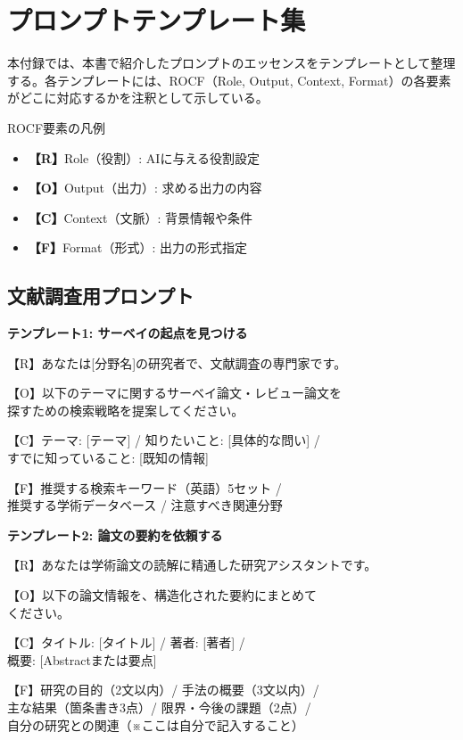 \chapter{プロンプトテンプレート集}
\label{app:prompts}

本付録では、本書で紹介したプロンプトのエッセンスをテンプレートとして整理する。各テンプレートには、ROCF（Role, Output, Context, Format）の各要素がどこに対応するかを注釈として示している。

\begin{itembox}[l]{ROCF要素の凡例}
\begin{itemize}
\item \textbf{【R】}Role（役割）: AIに与える役割設定
\item \textbf{【O】}Output（出力）: 求める出力の内容
\item \textbf{【C】}Context（文脈）: 背景情報や条件
\item \textbf{【F】}Format（形式）: 出力の形式指定
\end{itemize}
\end{itembox}

\section{文献調査用プロンプト}

\begin{promptbox}
\textbf{テンプレート1: サーベイの起点を見つける}

【R】あなたは[分野名]の研究者で、文献調査の専門家です。

【O】以下のテーマに関するサーベイ論文・レビュー論文を\\
探すための検索戦略を提案してください。

【C】テーマ: [テーマ] / 知りたいこと: [具体的な問い] /\\
すでに知っていること: [既知の情報]

【F】推奨する検索キーワード（英語）5セット /\\
推奨する学術データベース / 注意すべき関連分野
\end{promptbox}

\begin{promptbox}
\textbf{テンプレート2: 論文の要約を依頼する}

【R】あなたは学術論文の読解に精通した研究アシスタントです。

【O】以下の論文情報を、構造化された要約にまとめて\\
ください。

【C】タイトル: [タイトル] / 著者: [著者] /\\
概要: [Abstractまたは要点]

【F】研究の目的（2文以内）/ 手法の概要（3文以内）/\\
主な結果（箇条書き3点）/ 限界・今後の課題（2点）/\\
自分の研究との関連（※ここは自分で記入すること）
\end{promptbox}

